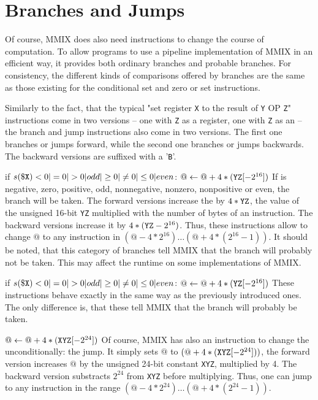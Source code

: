 \section{Branches and Jumps}

Of course, MMIX does also need instructions to change the course of computation. To allow programs to use a pipeline implementation of MMIX in an efficient way, it provides both ordinary branches and probable branches. For consistency, the different kinds of comparisons offered by branches are the same as those existing for the conditional set and zero or set instructions.

Similarly to the fact, that the typical "set register {\tt X} to the result of {\tt Y} OP {\tt Z}" instructions come in two versions -- one with {\tt Z} as a register, one with {\tt Z} as an  -- the branch and jump instructions also come in two versions. The first one branches or jumps forward, while the second one branches or jumps backwards. The backward versions are suffixed with a '{\tt B}'.

\instrtbl
	{}
	{if $s(\dr{X}) <0|=0|>0|odd|\ge0|\ne0|\le0|even$: $@ \leftarrow @+4*({\tt YZ}[-2^{16}])$}
\noindent If  is negative, zero, positive, odd, nonnegative, nonzero, nonpositive or even, the branch will be taken. The forward versions increase the  by $4*{\tt YZ}$, \ie the value of the unsigned 16-bit  {\tt YZ} multiplied with the number of bytes of an instruction. The backward versions increase it by $4*({\tt YZ}-2^{16})$. Thus, these instructions allow to change $@$ to any instruction in $(@ - 4*2^{16}) \dots (@ + 4*(2^{16}-1))$. It should be noted, that this category of branches tell MMIX that the branch will probably not be taken. This may affect the runtime on some implementations of MMIX. \citep[pg. 12]{mmix-doc}

\instrtbl
	{}
	{if $s(\dr{X}) <0|=0|>0|odd|\ge0|\ne0|\le0|even$: $@ \leftarrow @+4*({\tt YZ}[-2^{16}])$}
\noindent These instructions behave exactly in the same way as the previously introduced ones. The only difference is, that these tell MMIX that the branch will probably be taken. \citep[pg. 12]{mmix-doc}

\instrtbl
	{}
	{$@ \leftarrow @+4*({\tt XYZ}[-2^{24}])$}
\noindent Of course, MMIX has also an instruction to change the  unconditionally: the jump. It simply sets $@$ to $(@+4*({\tt XYZ}[-2^{24}]))$, \ie the forward version increases $@$ by the unsigned 24-bit constant {\tt XYZ}, multiplied by 4. The backward version substracts $2^{24}$ from {\tt XYZ} before multiplying. Thus, one can jump to any instruction in the range $(@ - 4*2^{24}) \dots (@ + 4*(2^{24}-1))$. \citep[pg. 13]{mmix-doc}

